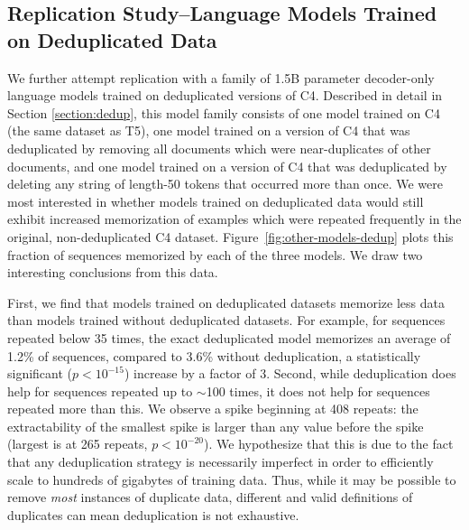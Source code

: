 \subsection{Replication Study--Language Models Trained on Deduplicated Data}

We further attempt replication with a family of 1.5B parameter decoder-only language models trained on deduplicated versions of C4.
Described in detail in Section \ref{section:dedup}, this model family consists of one model trained on C4 (the same dataset as T5), one model trained on a version of C4 that was deduplicated by removing all documents which were near-duplicates of other documents, and one model trained on a version of C4 that was deduplicated by deleting any string of length-50 tokens that occurred more than once.
We were most interested in whether models trained on deduplicated data would still exhibit increased memorization of examples which were repeated frequently in the original, non-deduplicated C4 dataset.
%
Figure~\ref{fig:other-models-dedup} plots this fraction of sequences memorized by each of the three models.
%
We draw two interesting conclusions from this data.


First, we find that models trained on deduplicated datasets memorize less data than models trained without deduplicated datasets.
%
For example, for sequences repeated below 35 times, the exact deduplicated model memorizes an average of 1.2\% of sequences, compared to 3.6\% without deduplication, a statistically significant ($p<10^{-15}$) increase by a factor of 3. 
Second, while deduplication does help for sequences repeated up to $\sim$100 times,
it does not help for sequences repeated more than this.
%
We observe a spike beginning at 408 repeats: the extractability of the smallest spike is larger than any value before the spike (largest is at 265 repeats, $p<10^{-20}$).
%
We hypothesize that this is due to the fact that any deduplication strategy is necessarily
imperfect in order to efficiently scale to hundreds of gigabytes of training data.
%
Thus, while it may be possible to remove \emph{most} instances of duplicate data, different and valid definitions of duplicates can mean deduplication is not exhaustive.

